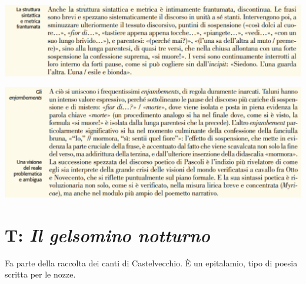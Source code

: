 \documentclass[a4paper, twoside, titlepage]{book}
\begin{document}
\begin{center}
\includegraphics[width=\textwidth]{digitale6}
\end{center}
\vfill
\begin{center}
\includegraphics[width=\textwidth]{digitale7}
\end{center}

\chapter{T: \textit{Il gelsomino notturno}}

Fa parte della raccolta dei canti di Castelvecchio.
È un epitalamio, tipo di poesia scritta per le nozze.
\end{document}

